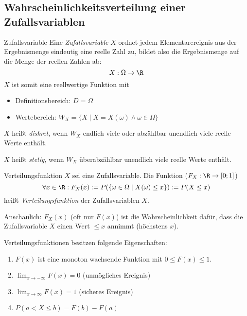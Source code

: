 \subsection{Wahrscheinlichkeitsverteilung einer Zufallsvariablen}

\begin{defi}{Zufallsvariable}
    Eine \emph{Zufallsvariable} $X$ ordnet jedem Elementarereignis aus der Ergebnismenge eindeutig eine reelle Zahl zu, bildet also die Ergebnismenge auf die Menge der reellen Zahlen ab:
    \[
        X: \Omega \to \R
    \]
    $X$ ist somit eine reellwertige Funktion mit
    \begin{itemize}
        \item Definitionsbereich: $D = \Omega$
        \item Wertebereich: $W_X = \{ X \mid X = X(\omega) \land \omega \in \Omega \}$
    \end{itemize}

    $X$ heißt \emph{diskret}, wenn $W_X$ endlich viele oder abzählbar unendlich viele reelle Werte enthält.

    $X$ heißt \emph{stetig}, wenn $W_X$ überabzählbar unendlich viele reelle Werte enthält.
\end{defi}

\begin{defi}{Verteilungsfunktion}
    $X$ sei eine Zufallsvariable.
    Die Funktion ($F_X: \R \to [0;1]$)
    \[
        \forall x \in \R: F_X(x) := P(\{ \omega \in \Omega \mid X(\omega) \leq x \}) := P(X \leq x)
    \]
    heißt \emph{Verteilungsfunktion} der Zufallsvariablen $X$.

    Anschaulich:
    $F_X(x)$ (oft nur $F(x)$) ist die Wahrscheinlichkeit dafür, dass die Zufallsvariable $X$ einen Wert $\leq x$ annimmt (höchstens $x$).

    Verteilungsfunktionen besitzen folgende Eigenschaften:
    \begin{enumerate}
        \item $F(x)$ ist eine monoton wachsende Funktion mit $0 \leq F(x) \leq 1$.
        \item $\lim_{x \to -\infty} F(x) = 0$ (unmögliches Ereignis)
        \item $\lim_{x \to \infty} F(x) = 1$ (sicheres Ereignis)
        \item $P(a < X \leq b) = F(b) - F(a)$
    \end{enumerate}
\end{defi}

